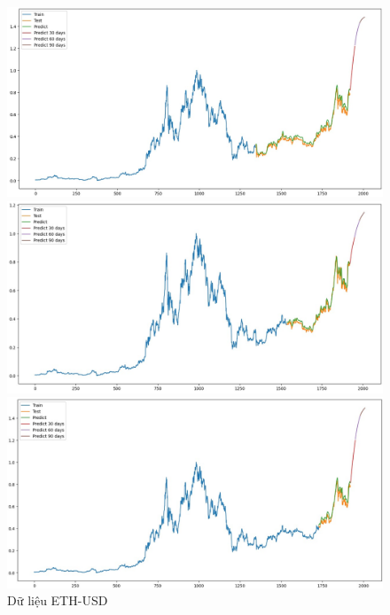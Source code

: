 \documentclass[conference]{IEEEtran}
\begin{document}
\begin{figure}[H]
    \centering
    \begin{minipage}{0.15\textwidth}
    \centering
    \includegraphics[width=1\textwidth]{Figure/LSTM_ETH_7.jpg}
    \end{minipage}
    \hfill
    \begin{minipage}{0.15\textwidth}
    \centering
    \includegraphics[width=1\textwidth]{Figure/LSTM_ETH_8.jpg}
    \end{minipage}
    \hfill
    \begin{minipage}{0.15\textwidth}
    \centering
    \includegraphics[width=1\textwidth]{Figure/LSTM_ETH_9.jpg}
    \end{minipage}
    \caption{Dữ liệu ETH-USD}
    \label{fig:1}
\end{figure}
\end{document}

